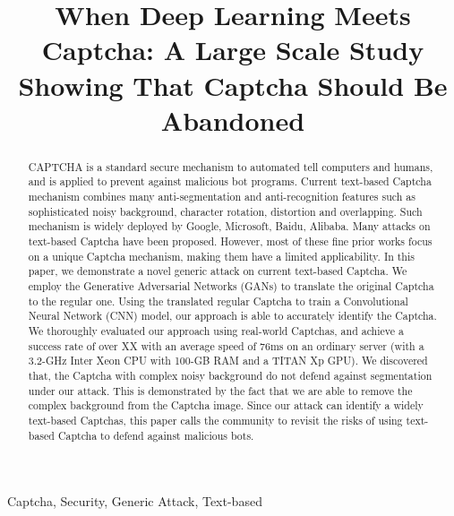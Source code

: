 \documentclass[10pt,conference]{IEEEtran}
\begin{document}

\title{When Deep Learning Meets Captcha: A Large Scale Study Showing That Captcha Should Be Abandoned}
\author{
}

\IEEEoverridecommandlockouts \makeatletter{}\makeatother \IEEEpubid{\parbox{\columnwidth}{ }
\hspace{\columnsep}\makebox[\columnwidth]{}}

\maketitle

\begin{abstract}

CAPTCHA is a standard secure mechanism to automated tell computers and humans, and is applied to prevent against malicious bot programs.
Current text-based Captcha mechanism combines many anti-segmentation and anti-recognition features such as sophisticated noisy background,
character rotation, distortion and overlapping. Such mechanism is widely deployed by Google, Microsoft, Baidu, Alibaba. Many attacks on
text-based Captcha have been proposed. However, most of these fine prior works focus on a unique Captcha mechanism, making them have a
limited applicability. In this paper, we demonstrate a novel generic attack on current text-based Captcha. We employ the Generative
Adversarial Networks (GANs) to translate the original Captcha to the regular one. Using the translated regular Captcha to train a
Convolutional Neural Network (CNN) model, our approach is able to accurately identify the Captcha. We thoroughly evaluated our approach
using real-world Captchas, and achieve a success rate of over XX with an average speed of 76ms on an ordinary server (with a 3.2-GHz Inter
Xeon CPU with 100-GB RAM and a TITAN Xp GPU). We discovered that, the Captcha with complex noisy background do not defend against
segmentation under our attack. This is demonstrated by the fact that we are able to remove the complex background from the Captcha image.
Since our attack can identify a widely text-based Captchas, this paper calls the community to revisit the risks of using text-based Captcha
to defend against malicious bots.
\end{abstract}

\begin{IEEEkeywords}
    Captcha, Security, Generic Attack, Text-based
\end{IEEEkeywords}
\end{document}

